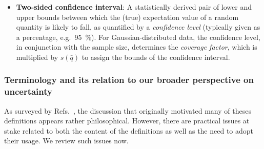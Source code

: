 \begin{itemize}
\item {\bf Two-sided confidence interval}: A statistically derived pair of lower and upper bounds between which the (true) expectation value of a random quantity is likely to fall, as quantified by a {\it confidence level} (typically given as a percentage, e.g.\ 95~\%).
  For Gaussian-distributed data, the confidence level, in conjunction with the sample size, determines the {\it coverage factor}, which is multiplied by \hyperref[def:exp_st_dev_mean]{$s\left(\bar{q}\right)$} to assign the bounds of the confidence interval.
  \label{def:conf_int}

\end{itemize}





\subsubsection{Terminology and its relation to our broader perspective on uncertainty}

As surveyed by Refs.~\citep{JCGM:GUM2008,JCGM:VIM2012}, the discussion that originally motivated many of theses definitions appears rather philosophical.  However, there are practical issues at stake related to both the content of the definitions as well as the need to adopt their usage.  We review such issues now.


